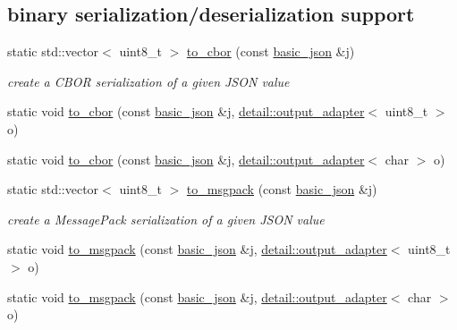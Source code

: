 \subsection*{binary serialization/deserialization support}
\begin{DoxyCompactItemize}
\item 
static std\+::vector$<$ uint8\+\_\+t $>$ \hyperlink{classnlohmann_1_1basic__json_a2566783e190dec524bf3445b322873b8}{to\+\_\+cbor} (const \hyperlink{classnlohmann_1_1basic__json}{basic\+\_\+json} \&j)
\begin{DoxyCompactList}\small\item\em create a C\+B\+OR serialization of a given J\+S\+ON value \end{DoxyCompactList}\item 
static void \hyperlink{classnlohmann_1_1basic__json_a5d9a89ac7ed08171a22dc6d65d033c09}{to\+\_\+cbor} (const \hyperlink{classnlohmann_1_1basic__json}{basic\+\_\+json} \&j, \hyperlink{classnlohmann_1_1detail_1_1output__adapter}{detail\+::output\+\_\+adapter}$<$ uint8\+\_\+t $>$ o)
\item 
static void \hyperlink{classnlohmann_1_1basic__json_a6defa7ec3d3ace8f713f001f720182d7}{to\+\_\+cbor} (const \hyperlink{classnlohmann_1_1basic__json}{basic\+\_\+json} \&j, \hyperlink{classnlohmann_1_1detail_1_1output__adapter}{detail\+::output\+\_\+adapter}$<$ char $>$ o)
\item 
static std\+::vector$<$ uint8\+\_\+t $>$ \hyperlink{classnlohmann_1_1basic__json_a09ca1dc273d226afe0ca83a9d7438d9c}{to\+\_\+msgpack} (const \hyperlink{classnlohmann_1_1basic__json}{basic\+\_\+json} \&j)
\begin{DoxyCompactList}\small\item\em create a Message\+Pack serialization of a given J\+S\+ON value \end{DoxyCompactList}\item 
static void \hyperlink{classnlohmann_1_1basic__json_a4ef190107be36fea6b6c63d71d439c99}{to\+\_\+msgpack} (const \hyperlink{classnlohmann_1_1basic__json}{basic\+\_\+json} \&j, \hyperlink{classnlohmann_1_1detail_1_1output__adapter}{detail\+::output\+\_\+adapter}$<$ uint8\+\_\+t $>$ o)
\item 
static void \hyperlink{classnlohmann_1_1basic__json_a99efe44b502de2762a433ce3688ec2d2}{to\+\_\+msgpack} (const \hyperlink{classnlohmann_1_1basic__json}{basic\+\_\+json} \&j, \hyperlink{classnlohmann_1_1detail_1_1output__adapter}{detail\+::output\+\_\+adapter}$<$ char $>$ o)
\item 

\end{DoxyCompactItemize}

